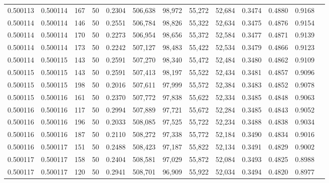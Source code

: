\begin{tabular}{rrrrrrrrrrrrr}
0.500113 & 0.500114 &   167 &  50 &                                     0.2304 & 506,638 &  98,972 &  55,272 &  52,684 & 0.3474 & 0.4880 & 0.9168 \\
0.500114 & 0.500114 &   146 &  50 &                                     0.2551 & 506,784 &  98,826 &  55,322 &  52,634 & 0.3475 & 0.4876 & 0.9154 \\
0.500114 & 0.500114 &   170 &  50 &                                     0.2273 & 506,954 &  98,656 &  55,372 &  52,584 & 0.3477 & 0.4871 & 0.9139 \\
0.500114 & 0.500114 &   173 &  50 &                                     0.2242 & 507,127 &  98,483 &  55,422 &  52,534 & 0.3479 & 0.4866 & 0.9123 \\
0.500114 & 0.500115 &   143 &  50 &                                     0.2591 & 507,270 &  98,340 &  55,472 &  52,484 & 0.3480 & 0.4862 & 0.9109 \\
0.500115 & 0.500115 &   143 &  50 &                                     0.2591 & 507,413 &  98,197 &  55,522 &  52,434 & 0.3481 & 0.4857 & 0.9096 \\
0.500115 & 0.500115 &   198 &  50 &                                     0.2016 & 507,611 &  97,999 &  55,572 &  52,384 & 0.3483 & 0.4852 & 0.9078 \\
0.500115 & 0.500116 &   161 &  50 &                                     0.2370 & 507,772 &  97,838 &  55,622 &  52,334 & 0.3485 & 0.4848 & 0.9063 \\
0.500116 & 0.500116 &   117 &  50 &                                     0.2994 & 507,889 &  97,721 &  55,672 &  52,284 & 0.3485 & 0.4843 & 0.9052 \\
0.500116 & 0.500116 &   196 &  50 &                                     0.2033 & 508,085 &  97,525 &  55,722 &  52,234 & 0.3488 & 0.4838 & 0.9034 \\
0.500116 & 0.500116 &   187 &  50 &                                     0.2110 & 508,272 &  97,338 &  55,772 &  52,184 & 0.3490 & 0.4834 & 0.9016 \\
0.500116 & 0.500117 &   151 &  50 &                                     0.2488 & 508,423 &  97,187 &  55,822 &  52,134 & 0.3491 & 0.4829 & 0.9002 \\
0.500117 & 0.500117 &   158 &  50 &                                     0.2404 & 508,581 &  97,029 &  55,872 &  52,084 & 0.3493 & 0.4825 & 0.8988 \\
0.500117 & 0.500117 &   120 &  50 &                                     0.2941 & 508,701 &  96,909 &  55,922 &  52,034 & 0.3494 & 0.4820 & 0.8977 \\

\end{tabular}
